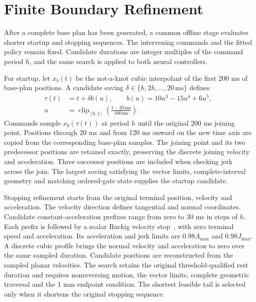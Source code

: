 \documentclass[pdflatex,sn-apa]{sn-jnl}
\begin{document}
\section{Finite Boundary Refinement}
\label{app:boundary}
After a complete base plan has been generated, a common offline stage evaluates shorter startup and stopping sequences. The intervening commands and the fitted policy remain fixed. Candidate durations are integer multiples of the command period $h$, and the same search is applied to both neural controllers.

For startup, let $x_b(t)$ be the not-a-knot cubic interpolant of the first 200 ms of base-plan positions. A candidate saving $\delta\in\{h,2h,\ldots,20\,\mathrm{ms}\}$ defines
\begin{equation}
\begin{aligned}
\tau(t)&=t+\delta b(u),\qquad
b(u)=10u^3-15u^4+6u^5,\\
u&=\operatorname{clip}_{[0,1]}\!\left(\frac{t-20\,\mathrm{ms}}{100\,\mathrm{ms}}\right).
\end{aligned}
\label{eq:boundary_time_map}
\end{equation}
Commands sample $x_b(\tau(t))$ at period $h$ until the original 200 ms joining point. Positions through 20 ms and from 120 ms onward on the new time axis are copied from the corresponding base-plan samples. The joining point and its two predecessor positions are retained exactly, preserving the discrete joining velocity and acceleration. Three successor positions are included when checking jerk across the join. The largest saving satisfying the vector limits, complete-interval geometry and matching ordered-gate state supplies the startup candidate.

Stopping refinement starts from the original terminal position, velocity and acceleration. The velocity direction defines tangential and normal coordinates. Candidate constant-acceleration prefixes range from zero to 30 ms in steps of $h$. Each prefix is followed by a scalar Ruckig velocity stop~\citep{Berscheid2021Ruckig}, with zero terminal speed and acceleration. Its acceleration and jerk limits are $0.98A_{\max}$ and $0.98J_{\max}$. A discrete cubic profile brings the normal velocity and acceleration to zero over the same sampled duration. Candidate positions are reconstructed from the sampled planar velocities. The search retains the original threshold-qualified rest duration and requires nonreversing motion, the vector limits, complete geometric traversal and the 1 mm endpoint condition. The shortest feasible tail is selected only when it shortens the original stopping sequence.
\end{document}
